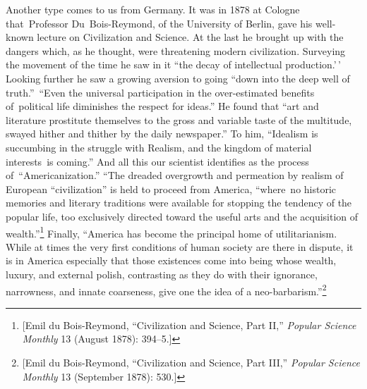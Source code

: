 \documentclass[openany,nobib]{tufte-book}
\begin{document}
Another type comes to us from Germany. It was in 1878 at Cologne
that~Professor Du~Bois-Reymond, of the University of Berlin, gave his
well-known lecture on Civilization and Science. At the last he brought
up with the dangers which, as he thought, were threatening modern
civilization. Surveying the movement of the time he saw in it ``the
decay of intellectual production.'\,' Looking further he saw a growing
aversion to going ``down into the deep well of truth.''~``Even the
universal participation in the over-estimated benefits of~political life
diminishes the respect for ideas.'' He found that ``art and literature
prostitute themselves to the gross and variable taste of the multitude,
swayed hither and thither by the daily newspaper.'' To him, ``Idealism
is succumbing in the struggle with Realism, and the kingdom of material
interests~is coming.'' And all this our scientist identifies as the
process of~``Americanization.'' ``The dreaded overgrowth and permeation
by realism of European ``civilization'' is held to proceed from America,
``where~no historic memories and literary traditions were available for
stopping the tendency of the popular life, too exclusively directed
toward the useful arts and the acquisition of wealth.''\footnote{{[}Emil
  du Bois-Reymond, ``Civilization and Science, Part II,'' \emph{Popular
  Science Monthly} 13 (August 1878): 394--5.{]}} Finally, ``America has
become the principal home of utilitarianism. While at times the very
first conditions of human society are there in dispute, it is in America
especially that those existences come into being whose wealth, luxury,
and external polish, contrasting as they do with their ignorance,
narrowness, and innate coarseness, give one the idea of a
neo-barbarism.''\footnote{{[}Emil du Bois-Reymond, ``Civilization and
  Science, Part III,'' \emph{Popular Science Monthly} 13 (September
  1878): 530.{]}}~
\end{document}
